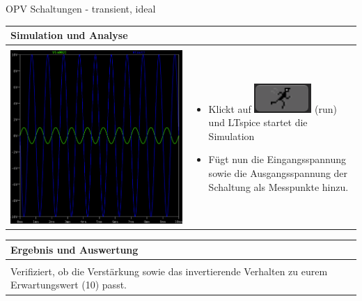 \begin{frame}[t]{OPV Schaltungen - transient, ideal}
\begin{spacing}{0.9}
\begin{tiny}
\begin{table}[h!]
\begin{tabular}{p{4cm} p{6cm}}
          \textbf{Simulation und Analyse} & \\
          \hline \\
          \begin{minipage}{.5\textwidth}
            \includegraphics[width=0.5\linewidth]{pictures/analysis_5.png}
          \end{minipage} 
          & 
          \begin{minipage}{.5\textwidth}
          \begin{itemize}
            \item Klickt auf \includegraphics[scale=0.3]{pictures/run.png} (run) und LTspice startet die Simulation
            \item Fügt nun die Eingangsspannung sowie die Ausgangsspannung der Schaltung als Messpunkte hinzu.
          \end{itemize}
          \end{minipage} 
          \\
        \end{tabular}
      \end{table}
    \end{tiny} \end{spacing}
    
      \begin{spacing}{0.9} \begin{tiny}
        \begin{table}[h!]
          \begin{tabular}{p{10cm} }
            \hline
            \textbf{Ergebnis und Auswertung} \\
            \hline \\    
            Verifiziert, ob die Verstärkung sowie das invertierende Verhalten zu eurem Erwartungswert (10) passt. 
          \end{tabular}
        \end{table}
      \end{tiny} \end{spacing}
      
       \end{frame}

